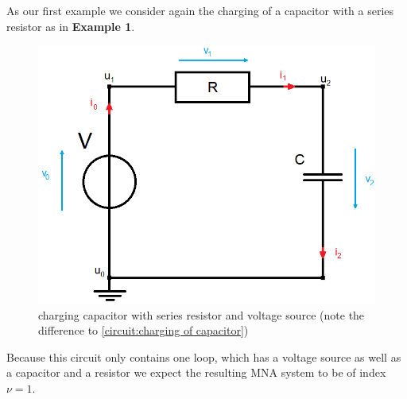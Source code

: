 \begin{example1}
	\label{ex:Index_Analysis}
	As our first example we consider again the charging of a capacitor with a series resistor as in \textbf{Example 1}.
	\begin{figure}[H]
		\centering
		\includegraphics[scale = 0.4]{pictures/Example1_simple_p2.png}
		\caption{charging capacitor with series resistor and voltage source (note the difference to \ref{circuit:charging of capacitor})} 
	\end{figure}
	Because this circuit only contains one loop, which has a voltage source as well as a capacitor and a resistor we expect the resulting MNA system to be of index $\nu=1$. 
	

\end{example1}
